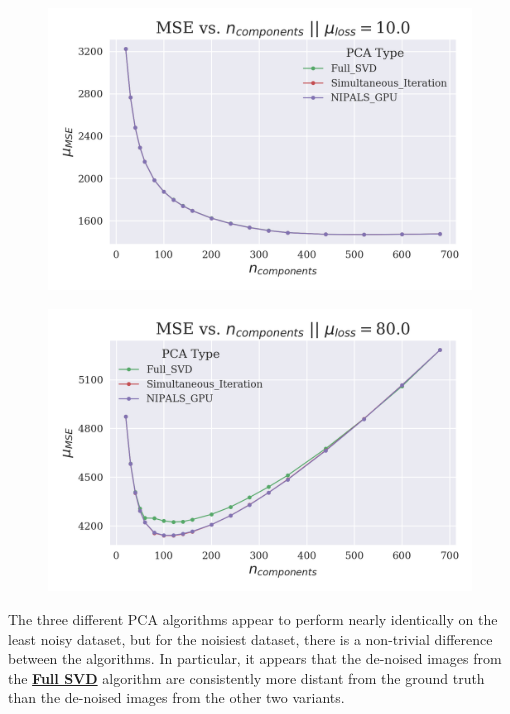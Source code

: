\documentclass[12pt]{article}
\begin{document}
\begin{figure}[H]
\centering
\begin{minipage}{.45\textwidth}
  \centering
  \includegraphics[width=\linewidth]{Noise10MSE.png}
  \label{Noise10MSE}
\end{minipage}%
\quad
\begin{minipage}{.45\textwidth}
  \centering
  \includegraphics[width=\linewidth]{Noise80MSE.png}
  \label{Noise80MSE}
\end{minipage}
\end{figure}

The three different PCA algorithms appear to perform nearly identically on the least noisy dataset, but for the noisiest dataset, there is a non-trivial difference between the algorithms. In particular, it appears that the de-noised images from the \textbf{\hyperref[3.2]{Full SVD}} algorithm are consistently more distant from the ground truth than the de-noised images from the other two variants.
\end{document}
